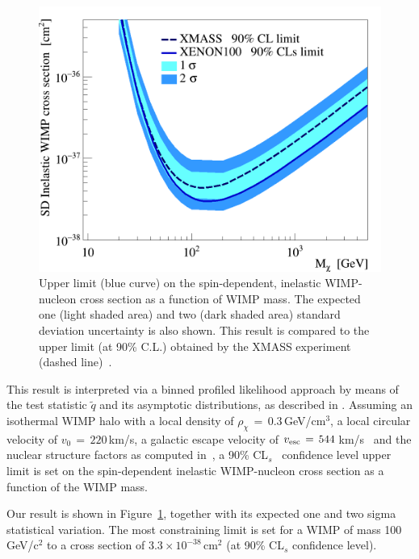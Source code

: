 \begin{figure}[t]
  \includegraphics[width=\linewidth]{limit_reb.png}
  \caption{Upper limit (blue curve) on the spin-dependent, inelastic WIMP-nucleon cross section as a function of WIMP mass.  
	  The expected one (light shaded area) and two (dark shaded area) standard deviation uncertainty is also shown. 
	  This result is compared to the upper limit (at 90\% C.L.) obtained by the XMASS experiment (dashed line)~\cite{Uchida:2014cnn}.}
  \label{fig:limits}
\end{figure}

This result is interpreted via a binned profiled likelihood approach by means of the test statistic $\tilde{q}$
and its asymptotic distributions, as  described in \cite{asympt}. 
Assuming  an isothermal WIMP halo with a local density of $\rho_{\chi} \, = \, 0.3$\,GeV/cm$^3$, a local circular velocity of $v_0 \,= \, 220$\,km/s, 
a galactic escape velocity of $v_{\rm{esc}} \, = \, 544$\,km/s~\cite{Smith:2006ym}  
and the nuclear structure factors as computed in~\cite{Baudis:2013bba}, 
a 90\% CL$_s$~\cite{cls} confidence level upper limit is set on the spin-dependent inelastic WIMP-nucleon cross section as a function of the WIMP mass. 



Our result is shown in Figure~\ref{fig:limits}, together with its expected one and two sigma statistical variation.
The most constraining limit is  set for a WIMP of mass 100\,GeV/c$^2$ to a cross section of $3.3 \times 10^{-38}$\,cm$^{2}$ (at 90\% CL$_s$ confidence level). 

